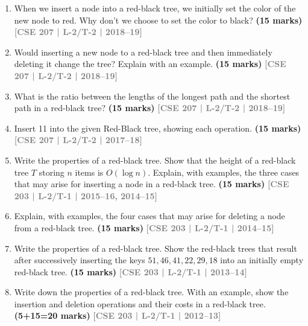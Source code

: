 \documentclass[12pt]{article}
\newcommand{\yr}[1]{\hfill\textcolor{gray}{\small\textbf{[#1]}}}
\newcommand{\mk}[1]{\textcolor{orange!70!black}{\small\textbf{(#1 marks)}}}
\begin{document}
\begin{enumerate}
\begin{center}
\begin{tikzpicture}
    \end{tikzpicture}
\end{center}
\mk{15} \yr{CSE 207 | L-2/T-2 | 2019--20}


\item When we insert a node into a red-black tree, we initially set the color of the new node to red. Why don't we choose to set the color to black?
\mk{15} \yr{CSE 207 | L-2/T-2 | 2018--19}


\item Would inserting a new node to a red-black tree and then immediately deleting it change the tree? Explain with an example.
\mk{15} \yr{CSE 207 | L-2/T-2 | 2018--19}


\item What is the ratio between the lengths of the longest path and the shortest path in a red-black tree?
\mk{15} \yr{CSE 207 | L-2/T-2 | 2018--19}


\item Insert 11 into the given Red-Black tree, showing each operation. \mk{15}
\yr{CSE 207 | L-2/T-2 | 2017--18}

\begin{center}
\end{center}


\item Write the properties of a red-black tree. Show that the height of a red-black tree $T$ storing $n$ items is $O(\log n)$. Explain, with examples, the three cases that may arise for inserting a node in a red-black tree. \mk{15}
\yr{CSE 203 | L-2/T-1 | 2015--16, 2014--15}


\item Explain, with examples, the four cases that may arise for deleting a node from a red-black tree. \mk{15}
\yr{CSE 203 | L-2/T-1 | 2014--15}


\item Write the properties of a red-black tree. Show the red-black trees that result after successively inserting the keys $51, 46, 41, 22, 29, 18$ into an initially empty red-black tree. \mk{15}
\yr{CSE 203 | L-2/T-1 | 2013--14}


\item Write down the properties of a red-black tree. With an example, show the insertion and deletion operations and their costs in a red-black tree. \mk{5+15=20}
\yr{CSE 203 | L-2/T-1 | 2012--13}


\end{enumerate}
\end{document}
